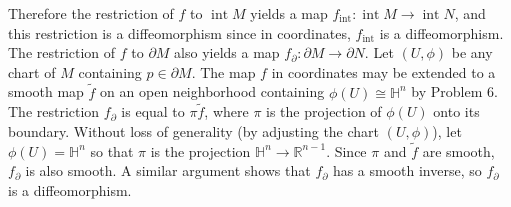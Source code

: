 \documentclass[11pt,leqno]{article}
\theoremstyle{plain}
\theoremstyle{definition}
\numberwithin{equation}{section}
\numberwithin{lem}{section}
\DeclareMathOperator{\Int}{int}
\begin{document}
\begin{enumerate}
\begin{enumerate}
        Therefore the restriction of $f$ to $\Int M$ yields a map $f_{\Int}\colon \Int M\to \Int N$, and this restriction is a diffeomorphism since in coordinates, $f_{\Int}$ is a diffeomorphism. The restriction of $f$ to $\partial M$ also yields a map $f_\partial\colon \partial M\to \partial N$. Let $(U,\phi)$ be any chart of $M$ containing $p\in \partial M$. The map $f$ in coordinates may be extended to a smooth map $\tilde f$ on an open neighborhood containing $\phi(U)\cong \mathbb H^n$ by Problem 6. The restriction $f_\partial$ is equal to $\pi \tilde f$, where $\pi$ is the projection of $\phi(U)$ onto its boundary. Without loss of generality (by adjusting the chart $(U,\phi)$), let $\phi(U) = \mathbb H^n$ so that $\pi$ is the projection $\mathbb H^n\to \mathbb R^{n-1}$. Since $\pi$ and $\tilde f$ are smooth, $f_ \partial$ is also smooth. A similar argument shows that $f_ \partial$ has a smooth inverse, so $f_ \partial$ is a diffeomorphism.
    \end{enumerate}
\end{enumerate}
\end{document}
